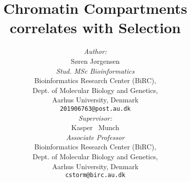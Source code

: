
\usepackage{arxiv}

\usepackage{lmodern}
\usepackage{url}            %
\usepackage{booktabs}       %
\usepackage{amsfonts}       %
\usepackage{nicefrac}       %
\usepackage{microtype}      %
\usepackage{lipsum}		
\usepackage{graphicx}
\usepackage{tikz}
\usepackage[numbers]{natbib}
\usepackage{doi}
\usepackage{amsmath}
\usepackage{amssymb}
\usepackage{svg}
\usepackage{verbatim}
\usepackage{subcaption}
\usepackage[linesnumbered, ruled, vlined]{algorithm2e}
\captionsetup{font=small, labelfont=bf}
\captionsetup[sub]{font=small, labelfont=bf} 
\captionsetup[subfigure]{justification=justified, singlelinecheck=false, skip=3pt}



\title{Chromatin Compartments correlates with Selection}

\author{{\emph{Author:}\\
    Søren Jørgensen}	\\
    \emph{Stud. MSc Bioinformatics} \\
    Bioinformatics Research Center (BiRC),\\
    Dept. of Molecular Biology and Genetics,\\
	Aarhus University, Denmark \\
	\texttt{201906763@post.au.dk} \\
    \And
    {\emph{Supervisor:}\\
    Kasper ~Munch}	\\
    \emph{Associate Professor} \\
    Bioinformatics Research Center (BiRC),\\
    Dept. of Molecular Biology and Genetics,\\
	Aarhus University, Denmark \\
	\texttt{cstorm@birc.au.dk} \\
}


\renewcommand{\headeright}{MSc Autumn2024}
\renewcommand{\undertitle}{30 ECTS Master's Thesis, Autumn 2024}
\renewcommand{\shorttitle}{Chromatin Compartments and Selection}
